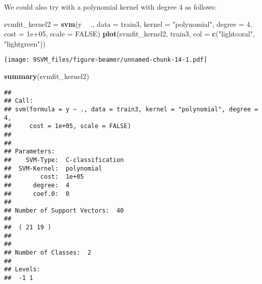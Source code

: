 \documentclass[10pt,ignorenonframetext,]{beamer}
\newenvironment{Shaded}{\begin{snugshade}}{\end{snugshade}}
\newcommand{\KeywordTok}[1]{\textcolor[rgb]{0.13,0.29,0.53}{\textbf{#1}}}
\newcommand{\DataTypeTok}[1]{\textcolor[rgb]{0.13,0.29,0.53}{#1}}
\newcommand{\DecValTok}[1]{\textcolor[rgb]{0.00,0.00,0.81}{#1}}
\newcommand{\FloatTok}[1]{\textcolor[rgb]{0.00,0.00,0.81}{#1}}
\newcommand{\StringTok}[1]{\textcolor[rgb]{0.31,0.60,0.02}{#1}}
\newcommand{\OtherTok}[1]{\textcolor[rgb]{0.56,0.35,0.01}{#1}}
\newcommand{\OperatorTok}[1]{\textcolor[rgb]{0.81,0.36,0.00}{\textbf{#1}}}
\newcommand{\NormalTok}[1]{#1}
\begin{document}
\begin{frame}[fragile]

We could also try with a polynomial kernel with degree 4 as follows:

\footnotesize

\begin{Shaded}
\begin{Highlighting}[]
\NormalTok{svmfit_kernel2 =}\StringTok{ }\KeywordTok{svm}\NormalTok{(y }\OperatorTok{~}\StringTok{ }\NormalTok{., }\DataTypeTok{data =}\NormalTok{ train3, }\DataTypeTok{kernel =} \StringTok{"polynomial"}\NormalTok{, }
    \DataTypeTok{degree =} \DecValTok{4}\NormalTok{, }\DataTypeTok{cost =} \FloatTok{1e+05}\NormalTok{, }\DataTypeTok{scale =} \OtherTok{FALSE}\NormalTok{)}
\KeywordTok{plot}\NormalTok{(svmfit_kernel2, train3, }\DataTypeTok{col =} \KeywordTok{c}\NormalTok{(}\StringTok{"lightcoral"}\NormalTok{, }\StringTok{"lightgreen"}\NormalTok{))}
\end{Highlighting}
\end{Shaded}

\texttt{[image: 9SVM\_files/figure-beamer/unnamed-chunk-14-1.pdf]}

\end{frame}

\begin{frame}[fragile]

\begin{Shaded}
\begin{Highlighting}[]
\KeywordTok{summary}\NormalTok{(svmfit_kernel2)}
\end{Highlighting}
\end{Shaded}

\begin{verbatim}
## 
## Call:
## svm(formula = y ~ ., data = train3, kernel = "polynomial", degree = 4, 
##     cost = 1e+05, scale = FALSE)
## 
## 
## Parameters:
##    SVM-Type:  C-classification 
##  SVM-Kernel:  polynomial 
##        cost:  1e+05 
##      degree:  4 
##      coef.0:  0 
## 
## Number of Support Vectors:  40
## 
##  ( 21 19 )
## 
## 
## Number of Classes:  2 
## 
## Levels: 
##  -1 1
\end{verbatim}

\normalsize

\end{frame}
\end{document}
